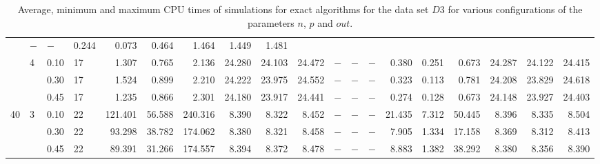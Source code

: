 \documentclass[thesis=B,english]{FITthesis}[2012/10/20]
\begin{document}
\begin{table}[h!]
\begin{adjustbox}{angle=90}
{\begin{tabular}{l|l|l|l|r|r|r|r|r|r|r|r|r|r|r|r|r|r|r|}
&     $-$ &     $-$ &       0.244 &  0.073 &   0.464 &       1.464 &   1.449 &   1.481 \\   & 4 & 0.10 & 17 &    1.307 &   0.765 &    2.136 &  24.280 &  24.103 &  24.472 &     $-$ &     $-$ &     $-$ &       0.380 &  0.251 &   0.673 &      24.287 &  24.122 &  24.415 \\   &   & 0.30 & 17 &    1.524 &   0.899 &    2.210 &  24.222 &  23.975 &  24.552 &     $-$ &     $-$ &     $-$ &       0.323 &  0.113 &   0.781 &      24.208 &  23.829 &  24.618 \\   &   & 0.45 & 17 &    1.235 &   0.866 &    2.301 &  24.180 &  23.917 &  24.441 &     $-$ &     $-$ &     $-$ &       0.274 &  0.128 &   0.673 &      24.148 &  23.927 &  24.403 \\40 & 3 & 0.10 & 22 &  121.401 &  56.588 &  240.316 &   8.390 &   8.322 &   8.452 &     $-$ &     $-$ &     $-$ &      21.435 &  7.312 &  50.445 &       8.396 &   8.335 &   8.504 \\   &   & 0.30 & 22 &   93.298 &  38.782 &  174.062 &   8.380 &   8.321 &   8.458 &     $-$ &     $-$ &     $-$ &       7.905 &  1.334 &  17.158 &       8.369 &   8.312 &   8.413 \\   &   & 0.45 & 22 &   89.391 &  31.266 &  174.557 &   8.394 &   8.372 &   8.478 &     $-$ &     $-$ &     $-$ &       8.883 &  1.382 &  38.292 &       8.380 &   8.356 &   8.390 \\
			 \hline 
			\end{tabular} 
			
			
			
			}
			
\end{adjustbox}
    
    \caption{Average, minimum and maximum CPU times of simulations for exact algorithms for the data set $D3$ for various configurations of the parameters $n$, $p$ and $out$.}
    \label{table:exact:3}
\end{table}








\end{document}
